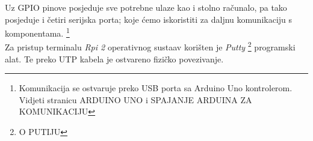 Uz GPIO pinove  posjeduje sve potrebne ulaze kao i stolno računalo, pa tako posjeduje i četiri serijska porta; koje ćemo iskoristiti za daljnu komunikaciju s komponentama. \footnote{Komunikacija se ostvaruje preko USB porta sa Arduino Uno 
kontrolerom. Vidjeti stranicu ARDUINO UNO i SPAJANJE ARDUINA ZA KOMUNIKACIJU}\\
Za pristup terminalu \textit{Rpi 2} operativnog sustaav korišten je \textit{Putty} \footnote{O PUTIJU} programski alat. Te preko UTP kabela je ostvareno fizičko povezivanje. 
